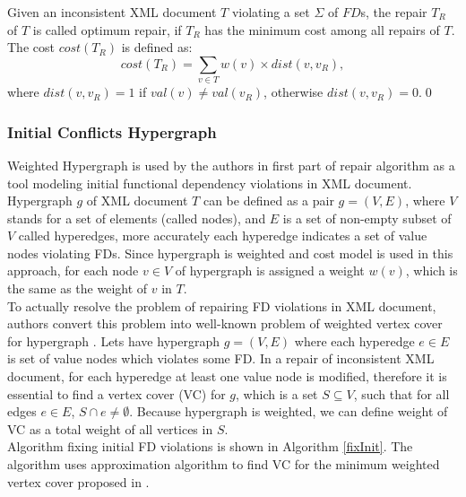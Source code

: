 \begin{define}
Given an inconsistent XML document $T$ violating a set $\Sigma$ of $FD$s, the repair $T_R$ of $T$ is called optimum repair, if $T_R$ has the minimum cost among all repairs of $T$. The cost $cost(T_R)$ is defined as:
\begin{displaymath}
cost(T_R) = \sum_{v \in T} w(v) \times dist(v, v_R),
\end{displaymath}
where $dist(v, v_R)=1$ if $val(v) \neq val(v_R)$, otherwise $dist(v, v_R)=0$.\qed
\end{define}

\subsubsection{Initial Conflicts Hypergraph}

Weighted Hypergraph is used by the authors in first part of repair algorithm as a tool modeling initial functional dependency violations in XML document. Hypergraph $g$ of XML document $T$ can be defined as a pair $g = (V,E)$, where $V$ stands for a set of elements (called nodes), and $E$ is a set of non-empty subset of $V$ called hyperedges, more accurately each hyperedge indicates a set of value nodes violating FDs. Since hypergraph is weighted and cost model is used in this approach, for each node $v \in V$ of hypergraph is assigned a weight $w(v)$, which is the same as the weight of $v$ in $T$.\\

To actually resolve the problem of repairing FD violations in XML document, authors convert this problem into well-known problem of weighted vertex cover for hypergraph \cite{ApproxAlgo}. Lets have hypergraph $g = (V,E)$ where each hyperedge $e \in E$ is set of value nodes which violates some FD. In a repair of inconsistent XML document, for each hyperedge at least one value node is modified, therefore it is essential to find a vertex cover (VC) for $g$, which is a set $S \subseteq V$, such that for all edges $e \in E$, $S \cap e \neq \emptyset$. Because hypergraph is weighted, we can define weight of VC as a total weight of all vertices in $S$.\\

Algorithm fixing initial FD violations is shown in Algorithm \ref{fixInit}. The algorithm uses approximation algorithm to find VC for the minimum weighted vertex cover proposed in \cite{ApproxAlgo}.

